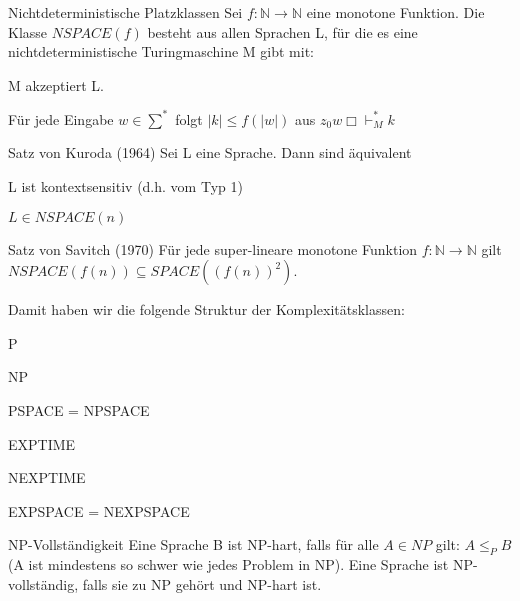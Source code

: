 \documentclass[avery5371, frame]{flashcards}
\begin{document}
\begin{flashcard}[Definition]{Nichtdeterministische Platzklassen}
    Sei $f:\mathbb{N}\rightarrow\mathbb{N}$ eine monotone Funktion. Die Klasse $NSPACE(f)$ besteht aus allen Sprachen L, für die es eine nichtdeterministische Turingmaschine M gibt mit:
    \begin{itemize*}
        \item M akzeptiert L.
        \item Für jede Eingabe $w\in\sum^*$ folgt $|k| \leq f(|w|)$ aus $z_0 w\Box\vdash_M^* k$
    \end{itemize*}
\end{flashcard}

\begin{flashcard}[Satz]{ Satz  von Kuroda (1964)}
    Sei L eine Sprache. Dann sind äquivalent
    \begin{enumerate*}
        \item L ist kontextsensitiv (d.h. vom Typ 1)
        \item $L\in NSPACE(n)$
    \end{enumerate*}
\end{flashcard}

\begin{flashcard}[Satz]{ Satz  von Savitch (1970)}
    Für jede super-lineare monotone Funktion $f:\mathbb{N}\rightarrow\mathbb{N}$ gilt $NSPACE (f(n))\subseteq SPACE((f(n))^2)$.

    Damit haben wir die folgende Struktur der Komplexitätsklassen:
    \begin{enumerate*}
        \item P
        \item NP
        \item PSPACE = NPSPACE
        \item EXPTIME
        \item NEXPTIME
        \item EXPSPACE = NEXPSPACE
    \end{enumerate*}
\end{flashcard}

\begin{flashcard}[Definition]{NP-Vollständigkeit}
    Eine Sprache B ist NP-hart, falls für alle $A\in NP$ gilt: $A \leq_P B$ (A ist mindestens so schwer wie jedes Problem in NP). Eine Sprache ist NP-vollständig, falls sie zu NP gehört und NP-hart ist.
\end{flashcard}
\end{document}
